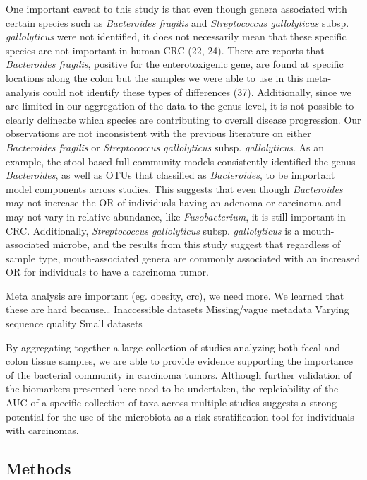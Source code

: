 \documentclass[12pt,]{article}
\begin{document}
One important caveat to this study is that even though genera associated
with certain species such as \emph{Bacteroides fragilis} and
\emph{Streptococcus gallolyticus} subsp. \emph{gallolyticus} were not
identified, it does not necessarily mean that these specific species are
not important in human CRC (22, 24). There are reports that
\emph{Bacteroides fragilis}, positive for the enterotoxigenic gene, are
found at specific locations along the colon but the samples we were able
to use in this meta-analysis could not identify these types of
differences (37). Additionally, since we are limited in our aggregation
of the data to the genus level, it is not possible to clearly delineate
which species are contributing to overall disease progression. Our
observations are not inconsistent with the previous literature on either
\emph{Bacteroides fragilis} or \emph{Streptococcus gallolyticus} subsp.
\emph{gallolyticus}. As an example, the stool-based full community
models consistently identified the genus \emph{Bacteroides}, as well as
OTUs that classified as \emph{Bacteroides}, to be important model
components across studies. This suggests that even though
\emph{Bacteroides} may not increase the OR of individuals having an
adenoma or carcinoma and may not vary in relative abundance, like
\emph{Fusobacterium}, it is still important in CRC. Additionally,
\emph{Streptococcus gallolyticus} subsp. \emph{gallolyticus} is a
mouth-associated microbe, and the results from this study suggest that
regardless of sample type, mouth-associated genera are commonly
associated with an increased OR for individuals to have a carcinoma
tumor.

Meta analysis are important (eg. obesity, crc), we need more. We learned
that these are hard because\ldots{} Inaccessible datasets Missing/vague
metadata Varying sequence quality Small datasets

By aggregating together a large collection of studies analyzing both
fecal and colon tissue samples, we are able to provide evidence
supporting the importance of the bacterial community in carcinoma
tumors. Although further validation of the biomarkers presented here
need to be undertaken, the replciability of the AUC of a specific
collection of taxa across multiple studies suggests a strong potential
for the use of the microbiota as a risk stratification tool for
individuals with carcinomas.

\newpage

\subsection{Methods}\label{methods}
\end{document}
